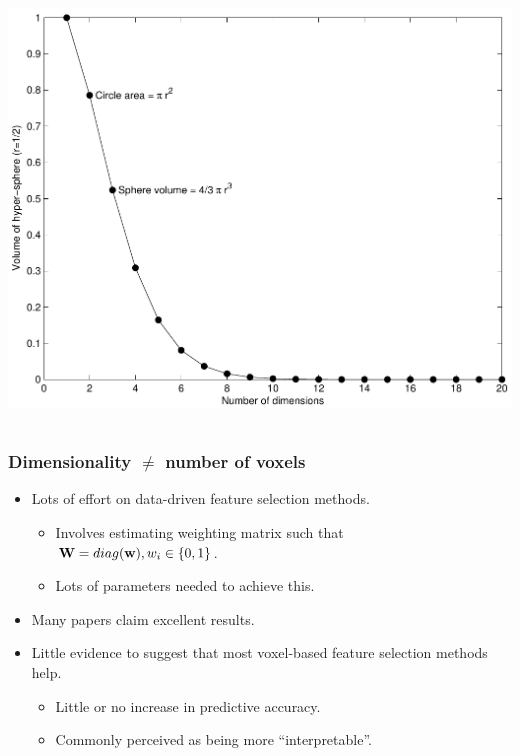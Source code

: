 \begin{frame}
\begin{columns}[c]
\includegraphics[width=\textwidth]{corners}
\end{columns}
\end{frame}




\begin{frame}
\frametitle{Dimensionality $\ne$ number of voxels}
\begin{itemize}
\item Lots of effort on data-driven feature selection methods.
\begin{itemize}
\item Involves estimating weighting matrix such that\\
      ${\bf W} = diag({\bf w}), w_i \in \{0,1\}$.
\item Lots of parameters needed to achieve this.
\end{itemize}
\item Many papers claim excellent results.
\item Little evidence to suggest that most voxel-based feature selection methods help.
\begin{itemize}
\item Little or no increase in predictive accuracy.
\item Commonly perceived as being more ``interpretable''.
\end{itemize}
\end{itemize}
\end{frame}

